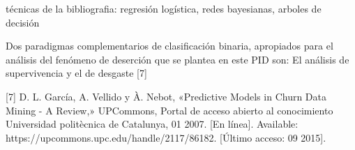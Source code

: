 técnicas de la bibliografia: regresión logística, redes bayesianas, arboles de decisión


Dos paradigmas complementarios de clasificación binaria, apropiados para el análisis
del fenómeno de deserción que se plantea en este PID son: El análisis de
supervivencia y el de desgaste [7]


[7] D. L. García, A. Vellido y À. Nebot, «Predictive Models in Churn Data Mining - A
Review,» UPCommons, Portal de acceso abierto al conocimiento Universidad
politècnica de Catalunya, 01 2007. [En línea]. Available:
https://upcommons.upc.edu/handle/2117/86182. [Último acceso: 09 2015].


